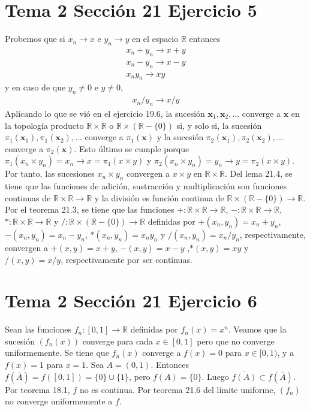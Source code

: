 \documentclass{article}
\newcommand{\vect}[1]{\boldsymbol{#1}}
\begin{document}
\section{Tema 2 Sección 21 Ejercicio 5}
Probemos que si $x_n\rightarrow x$ e $y_n\rightarrow y$ en el espacio $\mathbb{R}$ entonces 
\begin{eqnarray}
x_n+y_n\rightarrow x+y\nonumber\\
x_n-y_n\rightarrow x-y\nonumber\\
x_ny_n\rightarrow xy\nonumber
\end{eqnarray}
y en caso de que $y_n\neq 0$ e $y\neq 0$,
\begin{eqnarray}
x_n/y_n\rightarrow x/y\nonumber
\end{eqnarray}
Aplicando lo que se vió en el ejercicio 19.6, la sucesión $\vect{x}_1,\vect{x}_2,...$ converge a $\vect{x}$ en la topología producto $\mathbb{R} \times \mathbb{R}$ o $\mathbb{R} \times (\mathbb{R}-\{0\})$ si, y solo si, la sucesión $\pi_1(\vect{x}_1),\pi_1(\vect{x}_2),...$ converge a $\pi_1(\vect{x})$ y la sucesión $\pi_2(\vect{x}_1),\pi_2(\vect{x}_2),...$ converge a $\pi_2(\vect{x})$. Esto último se cumple porque $\pi_1(x_n\times y_n)=x_n\rightarrow x=\pi_1(x\times y)$ y $\pi_2(x_n\times y_n)=y_n\rightarrow y=\pi_2(x\times y)$. Por tanto, las sucesiones $x_n\times y_n$ convergen a $x\times y$ en $\mathbb{R}\times \mathbb{R}$. Del lema 21.4, se tiene que las funciones de adición, sustracción y multiplicación son funciones continuas de $\mathbb{R}\times \mathbb{R}\rightarrow \mathbb{R}$ y la división es función continua de $\mathbb{R}\times (\mathbb{R}-\{0\})\rightarrow \mathbb{R}$. Por el teorema 21.3, se tiene que las funciones $+:\mathbb{R}\times \mathbb{R}\rightarrow \mathbb{R}$, $-:\mathbb{R}\times \mathbb{R}\rightarrow \mathbb{R}$, $*:\mathbb{R}\times \mathbb{R}\rightarrow \mathbb{R}$ y $/:\mathbb{R}\times (\mathbb{R}-\{0\})\rightarrow \mathbb{R}$ definidas por $+(x_n,y_n)=x_n+y_n$, $-(x_n,y_n)=x_n-y_n$, $*(x_n,y_n)=x_ny_n$ y $/(x_n,y_n)=x_n/y_n$, respectivamente, convergen a $+(x,y)=x+y$, $-(x,y)=x-y$ ,$*(x,y)=xy$ y $/(x,y)=x/y$, respectivamente por ser contínuas.
\section{Tema 2 Sección 21 Ejercicio 6}
Sean las funciones $f_n:[0,1]\rightarrow \mathbb{R}$ definidas por $f_n(x)=x^n$. Veamos que la sucesión $(f_n(x))$ converge para cada $x\in[0,1]$ pero que no converge uniformemente. Se tiene que $f_n(x)$ converge a $f(x)=0$ para $x\in[0,1)$, y a $f(x)=1$ para $x=1$. Sea $A=(0,1)$. Entonces $f(\overline{A})=f([0,1])= \{0\}\cup \{1\}$, pero $f(A)=\{0\}$. Luego $\overline{f(A)}\subset f(\overline{A})$. Por teorema 18.1, $f$ no es continua. Por teorema 21.6 del límite uniforme, $(f_n)$ no converge uniformemente a $f$.
\end{document}
